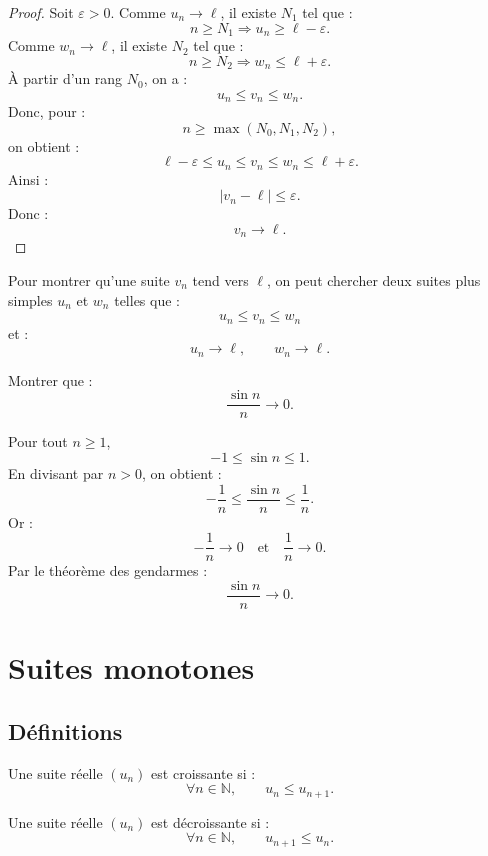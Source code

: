 \documentclass[11pt,a4paper]{article}
\newcommand{\N}{\mathbb N}
\newcommand{\abs}[1]{\left|#1\right|}
\newcommand{\implique}{\Longrightarrow}
\begin{document}
\begin{proof}
Soit \(\varepsilon>0\).  
Comme \(u_n\to\ell\), il existe \(N_1\) tel que :
\[
n\geq N_1\implique u_n\geq \ell-\varepsilon.
\]
Comme \(w_n\to\ell\), il existe \(N_2\) tel que :
\[
n\geq N_2\implique w_n\leq \ell+\varepsilon.
\]
À partir d'un rang \(N_0\), on a :
\[
u_n\leq v_n\leq w_n.
\]
Donc, pour :
\[
n\geq \max(N_0,N_1,N_2),
\]
on obtient :
\[
\ell-\varepsilon\leq u_n\leq v_n\leq w_n\leq \ell+\varepsilon.
\]
Ainsi :
\[
\abs{v_n-\ell}\leq\varepsilon.
\]
Donc :
\[
v_n\to\ell.
\]
\end{proof}

\begin{methodbox}
Pour montrer qu'une suite \(v_n\) tend vers \(\ell\), on peut chercher deux suites plus simples \(u_n\) et \(w_n\) telles que :
\[
u_n\leq v_n\leq w_n
\]
et :
\[
u_n\to\ell,\qquad w_n\to\ell.
\]
\end{methodbox}

\begin{exercicebox}[Gendarmes]
Montrer que :
\[
\frac{\sin n}{n}\to0.
\]
\end{exercicebox}

\begin{correctionbox}
Pour tout \(n\geq1\),
\[
-1\leq\sin n\leq1.
\]
En divisant par \(n>0\), on obtient :
\[
-\frac1n\leq\frac{\sin n}{n}\leq\frac1n.
\]
Or :
\[
-\frac1n\to0
\quad\text{et}\quad
\frac1n\to0.
\]
Par le théorème des gendarmes :
\[
\frac{\sin n}{n}\to0.
\]
\end{correctionbox}

\section{Suites monotones}

\subsection{Définitions}

\begin{definitionbox}
Une suite réelle \((u_n)\) est croissante si :
\[
\forall n\in\N,\qquad u_n\leq u_{n+1}.
\]
\end{definitionbox}

\begin{definitionbox}
Une suite réelle \((u_n)\) est décroissante si :
\[
\forall n\in\N,\qquad u_{n+1}\leq u_n.
\]
\end{definitionbox}
\end{document}
